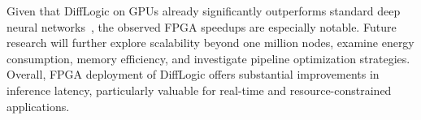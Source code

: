 Given that DiffLogic on GPUs already significantly outperforms standard deep neural networks~\cite{difflogic}, the observed FPGA speedups are especially notable. Future research will further explore scalability beyond one million nodes, examine energy consumption, memory efficiency, and investigate pipeline optimization strategies. Overall, FPGA deployment of DiffLogic offers substantial improvements in inference latency, particularly valuable for real-time and resource-constrained applications.











